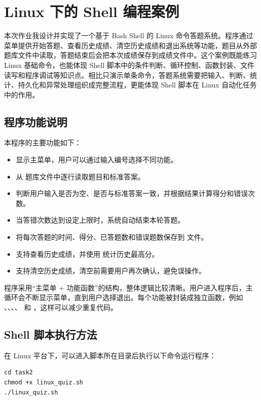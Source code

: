 \section{Linux 下的 Shell 编程案例}

本次作业我设计并实现了一个基于 Bash Shell 的 Linux 命令答题系统。程序通过菜单提供开始答题、查看历史成绩、清空历史成绩和退出系统等功能，题目从外部题库文件中读取，答题结束后会把本次成绩保存到成绩文件中。这个案例既能练习 Linux 基础命令，也能体现 Shell 脚本中的条件判断、循环控制、函数封装、文件读写和程序调试等知识点。相比只演示单条命令，答题系统需要把输入、判断、统计、持久化和异常处理组织成完整流程，更能体现 Shell 脚本在 Linux 自动化任务中的作用。

\subsection{程序功能说明}

本程序的主要功能如下：

\begin{itemize}
    \item 显示主菜单，用户可以通过输入编号选择不同功能。
    \item 从  题库文件中逐行读取题目和标准答案。
    \item 判断用户输入是否为空、是否与标准答案一致，并根据结果计算得分和错误次数。
    \item 当答错次数达到设定上限时，系统自动结束本轮答题。
    \item 将每次答题的时间、得分、已答题数和错误题数保存到  文件。
    \item 支持查看历史成绩，并使用  统计历史最高分。
    \item 支持清空历史成绩，清空前需要用户再次确认，避免误操作。
\end{itemize}

程序采用“主菜单 + 功能函数”的结构，整体逻辑比较清晰。用户进入程序后，主循环会不断显示菜单，直到用户选择退出。每个功能被封装成独立函数，例如 、、、、 和 ，这样可以减少重复代码。

\subsection{Shell 脚本执行方法}

在 Linux 平台下，可以进入脚本所在目录后执行以下命令运行程序：

\begin{verbatim}
cd task2
chmod +x linux_quiz.sh
./linux_quiz.sh
\end{verbatim}

